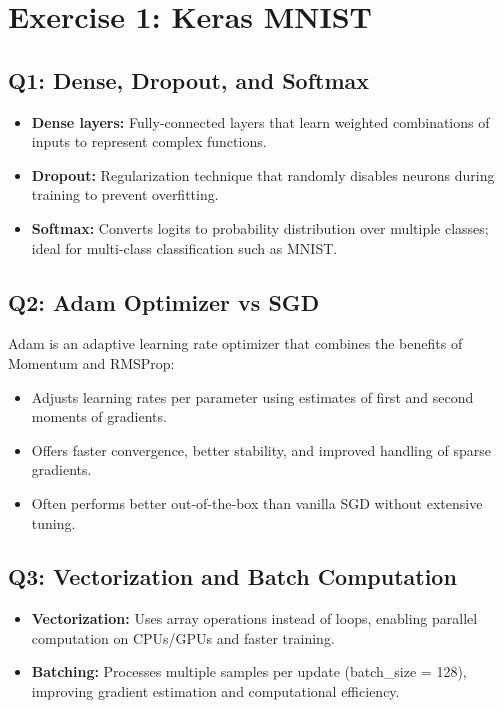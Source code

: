 \documentclass{article}
\begin{document}
\section{Exercise 1: Keras MNIST}

\subsection{Q1: Dense, Dropout, and Softmax}
\begin{itemize}[leftmargin=*]
    \item \textbf{Dense layers:} Fully-connected layers that learn weighted combinations of inputs to represent complex functions.
    \item \textbf{Dropout:} Regularization technique that randomly disables neurons during training to prevent overfitting.
    \item \textbf{Softmax:} Converts logits to probability distribution over multiple classes; ideal for multi-class classification such as MNIST.
\end{itemize}

\subsection{Q2: Adam Optimizer vs SGD}
Adam is an adaptive learning rate optimizer that combines the benefits of Momentum and RMSProp:
\begin{itemize}[leftmargin=*]
    \item Adjusts learning rates per parameter using estimates of first and second moments of gradients.
    \item Offers faster convergence, better stability, and improved handling of sparse gradients.
    \item Often performs better out-of-the-box than vanilla SGD without extensive tuning.
\end{itemize}

\subsection{Q3: Vectorization and Batch Computation}
\begin{itemize}[leftmargin=*]
    \item \textbf{Vectorization:} Uses array operations instead of loops, enabling parallel computation on CPUs/GPUs and faster training.
    \item \textbf{Batching:} Processes multiple samples per update (batch\_size = 128), improving gradient estimation and computational efficiency.
\end{itemize}
\end{document}
